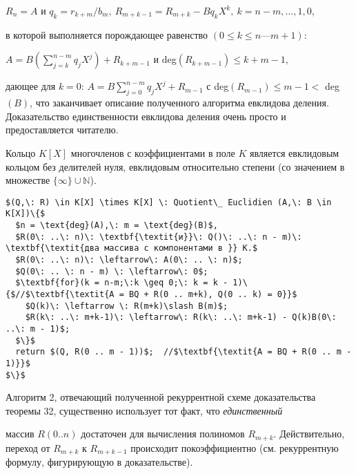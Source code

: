 \begin{center}
\noindent$R_n = A$ и $q_k = r_{k+m}\slash b_m,\: R_{m+k-1}=R_{m+k} - Bq_kX^k,\: k = n-m,...,1,0,$
\end{center}

\noindent в которой выполняется порождающее равенство $(0 \leqslant k \leqslant n — m + 1)$: 

\begin{center}
$A = B\left(\sum\limits_{j=k}^{n-m}q_jX^j\right)+R_{k+m-1}$ и deg$(R_{k+m-1})\leqslant k+m-1,$
\end{center}

\noindent дающее для $k = 0$: $A =B\sum_{j=0}^{n-m}q_jX^j + R_{m-1}$ с deg$(R_{m-1}) \leqslant m - 1 <$ 
deg$(B)$, что заканчивает описание полученного алгоритма евклидова 
деления. Доказательство единственности евклидова деления очень  
просто и предоставляется читателю. 

\begin{sled}
\hspace*{15pt}Кольцо $K[X]$ многочленов с коэффициентами в поле $K$ является  
евклидовым кольцом без делителей нуля, евклидовым относительно  
степени (со значением в множестве $\{\infty\}\cup \mathbb{N}$).\newline
\end{sled}

\begin{lstlisting}[mathescape=true, caption=Евклидово деление многочленов над полем]
$(Q,\: R) \in K[X] \times K[X] \: Quotient\_ Euclidien (A,\: B \in K[X])\{$
  $n = \text{deg}(A),\: m = \text{deg}(B)$,
  $R(0\: ..\: n)\: \textbf{\textit{и}}\: Q()\: ..\: n - m)\: \textbf{\textit{два массива с компонентами в }} K.$
  $R(0\: ..\: n)\: \leftarrow\: A(0\: .. \: n)$;
  $Q(0\: .. \: n - m) \: \leftarrow\: 0$;
  $\textbf{for}(k = n-m;\:k \geq 0;\: k = k - 1)\{$//$\textbf{\textit{A = BQ + R(0 .. m+k), Q(0 .. k) = 0}}$
    $Q(k)\: \leftarrow \: R(m+k)\slash B(m)$;
    $R(k\: ..\: m+k-1)\: \leftarrow\: R(k\: ..\: m+k-1) - Q(k)B(0\: ..\: m - 1)$;
  $\}$
  return $(Q, R(0 .. m - 1))$;  //$\textbf{\textit{A = BQ + R(0 .. m - 1)}}$
$\}$
\end{lstlisting}

Алгоритм 2, отвечающий полученной рекуррентной схеме  
доказательства теоремы 32, существенно использует тот факт, что \textit{единственный}
\newpage

\noindent массив $R(0 .. n)$ достаточен для вычисления полиномов $R_{m+k}$. 
Действительно, переход от $R_{m+k}$ к $R_{m+k-1}$ происходит покоэффициентно
 (см. рекуррентную формулу, фигурирующую в доказательстве).
 
